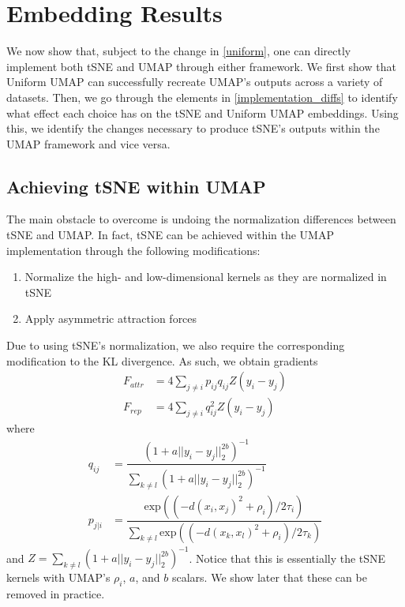 \documentclass{article}
\theoremstyle{definition}
\begin{document}
\section{Embedding Results} \label{results}
We now show that, subject to the change in \ref{uniform}, one can directly implement both tSNE and UMAP through either framework. We first show that Uniform UMAP
can successfully recreate UMAP's outputs across a variety of datasets. Then, we go through the elements in \ref{implementation_diffs} to identify what effect
each choice has on the tSNE and Uniform UMAP embeddings. Using this, we identify the changes necessary to produce tSNE's outputs within the UMAP framework and vice versa.

\subsection{Achieving tSNE within UMAP}
The main obstacle to overcome is undoing the normalization
differences between tSNE and UMAP. In fact, tSNE can be achieved within the UMAP implementation through the following modifications:
\begin{enumerate}
    \item Normalize the high- and low-dimensional kernels as they are normalized in tSNE
    \item Apply asymmetric attraction forces
\end{enumerate}
Due to using tSNE's normalization, we also require the corresponding modification to the KL divergence. As such, we obtain gradients
\begin{align*}
    F_{attr} &= 4 \sum_{j \neq i} p_{ij} q_{ij} Z (y_i - y_j) \\
   F_{rep} &= 4 \sum_{j \neq i} q_{ij}^2 Z (y_i - y_j)
\end{align*}
   where
\begin{align*}
   q_{ij} &= \dfrac{(1 + a ||y_i - y_j||_2^{2b})^{-1}}{\sum_{k \neq l} (1 + a ||y_i - y_j||_2^{2b})^{-1}} \\
    p_{j|i} &= \dfrac{\text{exp}( (-d(x_i, x_j)^2 + \rho_i) / 2 \tau_i)}{\sum_{k \neq l} \text{exp}( (-d(x_k, x_l)^2 + \rho_i) / 2 \tau_k)}
\end{align*}
   and $Z = \sum_{k \neq l} (1 + a ||y_i
   - y_j||_2^{2b})^{-1}$. Notice that this is essentially the tSNE kernels with UMAP's $\rho_i$, $a$, and $b$ scalars. We show later that these can be removed
   in practice.
\end{document}
